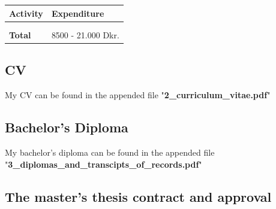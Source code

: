 \documentclass[a4paper]{article}
\begin{document}
\begin{center}
\begin{tabular}{  m{10cm} m{4cm} } 

	\hline
	\textbf{Activity}    & \textbf{Expenditure}\\
	\hline
	    &                               \\
 	    &                               \\
 	\hline
    \textbf{Total}       & 8500 - 21.000 Dkr.			    \\
    \hline

\end{tabular}
\end{center}


\pagebreak
\subsection{CV}

My CV can be found in the appended file "\textbf{2\_curriculum\_vitae.pdf}"

\subsection{Bachelor's Diploma}

My bachelor's diploma can be found in the appended file "\textbf{3\_diplomas\_and\_transcipts\_of\_records.pdf}"

\subsection{The master's thesis contract and approval}
\end{document}
